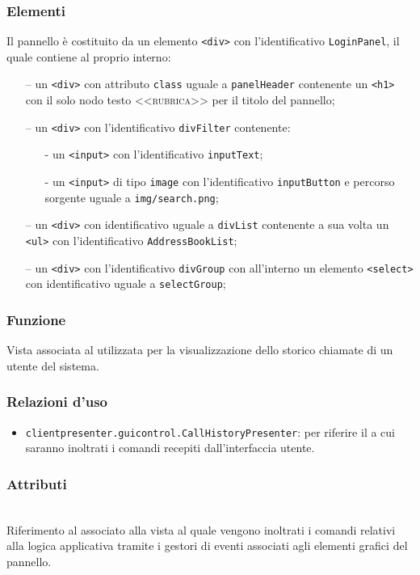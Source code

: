 \subsubsection*{Elementi}
Il pannello è costituito da un elemento \verb'<div>' con l'identificativo \verb'LoginPanel', il quale contiene al proprio interno:
\begin{itemize}
  \item[--] un \verb'<div>' con attributo \verb'class' uguale a \verb'panelHeader' contenente un \verb'<h1>' con il solo nodo testo \textsc{<<rubrica>>} per il titolo del pannello;
  \item[--] un \verb'<div>' con l'identificativo \verb'divFilter' contenente:
  \begin{itemize}
    \item[-] un \verb'<input>' con l'identificativo \verb'inputText';
    \item[-] un \verb'<input>' di tipo \verb'image' con l'identificativo \verb'inputButton' e percorso sorgente uguale a \verb'img/search.png';
  \end{itemize}
  \item[--] un \verb'<div>' con identificativo uguale a \verb'divList' contenente a sua volta un \verb'<ul>' con l'identificativo \verb'AddressBookList';
  \item[--] un \verb'<div>' con l'identificativo \verb'divGroup' con all'interno un elemento \verb'<select>' con identificativo uguale a \verb'selectGroup';
\end{itemize}


\subsubsection*{Funzione}
Vista associata al   utilizzata per la visualizzazione dello storico chiamate di un utente del sistema.

\subsubsection*{Relazioni d'uso}
\begin{itemize}
  \item \texttt{clientpresenter.guicontrol.CallHistoryPresenter}: per riferire il  a cui saranno inoltrati i comandi recepiti dall'interfaccia utente.
\end{itemize}

\subsubsection*{Attributi}
\begin{description}
  \item{}\\
  Riferimento al  associato alla vista al quale vengono inoltrati i comandi relativi alla logica applicativa tramite i gestori di eventi associati agli elementi grafici del pannello.
\end{description}


